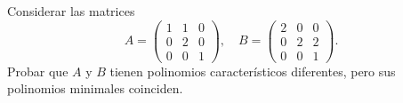 \item Considerar las matrices \[A=\begin{pmatrix}
        1&1&0\\0&2&0\\0&0&1
    \end{pmatrix},\quad B=\begin{pmatrix}
        2&0&0\\0&2&2\\0&0&1
    \end{pmatrix}.\]
    Probar que $A$ y $B$ tienen polinomios característicos diferentes, pero sus polinomios minimales coinciden.
    \begin{mdframed}[style=s]
        
    \end{mdframed}
